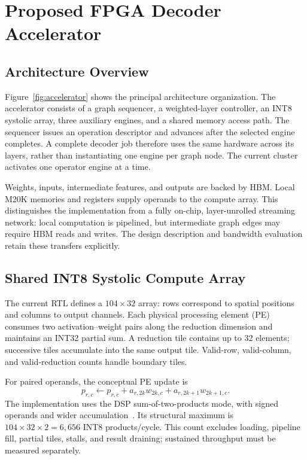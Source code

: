 \section{Proposed FPGA Decoder Accelerator}
\label{sec:accelerator}

\subsection{Architecture Overview}
Figure~\ref{fig:accelerator} shows the principal architecture organization.
The accelerator consists of a graph sequencer, a weighted-layer controller,
an INT8 systolic array, three auxiliary engines, and a shared memory access
path. The sequencer issues an operation descriptor and advances after the
selected engine completes. A complete decoder job therefore uses the same
hardware across its layers, rather than instantiating one engine per graph
node. The current cluster activates one operator engine at a time.

Weights, inputs, intermediate features, and outputs are backed by HBM. Local
M20K memories and registers supply operands to the compute array. This
distinguishes the implementation from a fully on-chip, layer-unrolled
streaming network: local computation is pipelined, but intermediate graph
edges may require HBM reads and writes. The design description and bandwidth
evaluation retain these transfers explicitly.

\subsection{Shared INT8 Systolic Compute Array}
The current RTL defines a $104\times32$ array: rows correspond to spatial
positions and columns to output channels. Each physical processing element
(PE) consumes two activation--weight pairs along the reduction dimension and
maintains an INT32 partial sum. A reduction tile contains up to 32 elements;
successive tiles accumulate into the same output tile. Valid-row,
valid-column, and valid-reduction counts handle boundary tiles.

For paired operands, the conceptual PE update is
\begin{equation}
  p_{r,c}\leftarrow p_{r,c}
       +a_{r,2k}w_{2k,c}+a_{r,2k+1}w_{2k+1,c}.
  \label{eq:pe}
\end{equation}
The implementation uses the DSP sum-of-two-products mode, with signed
operands and wider accumulation~\cite{intels10mxdsp}. Its structural maximum
is $104\times32\times2=6{,}656$ INT8 products/cycle. This count excludes
loading, pipeline fill, partial tiles, stalls, and result draining; sustained
throughput must be measured separately.


